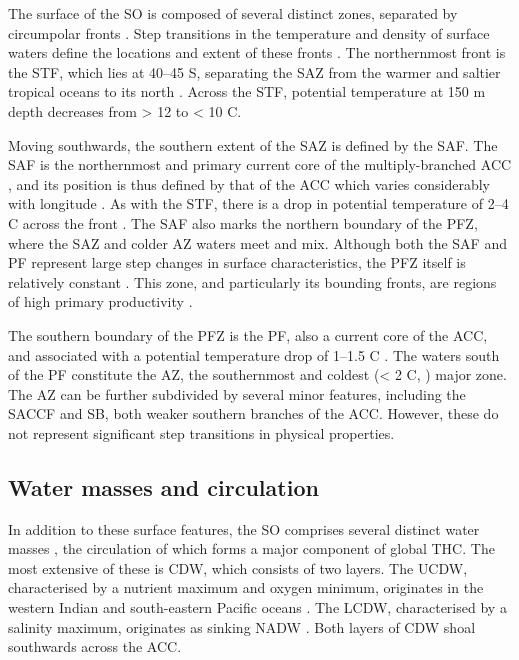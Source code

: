 The surface of the \ac{SO} is composed of several distinct zones, separated by circumpolar fronts .
Step transitions in the temperature and density of surface waters define the locations and extent of these fronts \cite{Sokolov:2002tc,Orsi:1995va}.
The northernmost front is the \ac{STF}, which lies at \textapprox{} 40--45\textdegree{} S, separating the \ac{SAZ} from the warmer and saltier tropical oceans to its north \cite{Sokolov:2002tc}.
Across the \ac{STF}, potential temperature at 150 m depth decreases from \textgreater{} 12 to \textless{} 10 \textdegree{}C.

Moving southwards, the southern extent of the \ac{SAZ} is defined by the \ac{SAF}.
The \ac{SAF} is the northernmost and primary current core of the multiply-branched \ac{ACC} \cite{Sokolov:2009wp}, and its position is thus defined by that of the \ac{ACC} which varies considerably with longitude \cite{Moore:1999to}.
As with the \ac{STF}, there is a drop in potential temperature of 2--4 \textdegree{}C across the front \cite{Sokolov:2002tc}.
The \ac{SAF} also marks the northern boundary of the \ac{PFZ}, where the \ac{SAZ} and colder \ac{AZ} waters meet and mix.
Although both the \ac{SAF} and \ac{PF} represent large step changes in surface characteristics, the \ac{PFZ} itself is relatively constant \cite{WhitworthIII:1987ky}.
This zone, and particularly its bounding fronts, are regions of high primary productivity \citep[e.g.][]{Laubscher:1993hu,Abell:2005ji}.

The southern boundary of the \ac{PFZ} is the \ac{PF}, also a current core of the \ac{ACC}, and associated with a potential temperature drop of \textapprox{} 1--1.5 \textdegree{}C \cite{Moore:1999to}.
The waters south of the \ac{PF} constitute the \ac{AZ}, the southernmost and coldest (\textless{} 2 \textdegree{}C, \citet{Sokolov:2002tc}) major zone.
The \ac{AZ} can be further subdivided by several minor features, including the \ac{SACCF} and \ac{SB}, both weaker southern branches of the \ac{ACC}.
However, these do not represent significant step transitions in physical properties.

\subsection{Water masses and circulation}

In addition to these surface features, the \ac{SO} comprises several distinct water masses , the circulation of which forms a major component of global \ac{THC}.
The most extensive of these is \ac{CDW}, which consists of two layers.
The \ac{UCDW}, characterised by a nutrient maximum and oxygen minimum, originates in the western Indian and south-eastern Pacific oceans \cite{Orsi:1995va}.
The \ac{LCDW}, characterised by a salinity maximum, originates as sinking \ac{NADW} \cite{WhitworthIII:1987ky}.
Both layers of \ac{CDW} shoal southwards across the \ac{ACC}.

